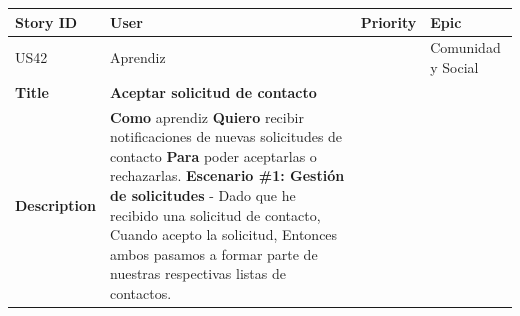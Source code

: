 {\def\LTcaptype{none} %
\begin{longtable}[]{@{}
  >{\raggedright\arraybackslash}p{}
  >{\raggedright\arraybackslash}p{}
  >{\raggedright\arraybackslash}p{}
  >{\raggedright\arraybackslash}p{}@{}}
\toprule\noalign{}
\begin{minipage}[b]{\linewidth}\raggedright
Story ID
\end{minipage} & \begin{minipage}[b]{\linewidth}\raggedright
User
\end{minipage} & \begin{minipage}[b]{\linewidth}\raggedright
Priority
\end{minipage} & \begin{minipage}[b]{\linewidth}\raggedright
Epic
\end{minipage} \\
\midrule\noalign{}
\endhead
\bottomrule\noalign{}
\endlastfoot
US42 & Aprendiz & 3 & Comunidad y Social \\
\textbf{Title} & \textbf{Aceptar solicitud de contacto} & & \\
\textbf{Description} & \textbf{Como} aprendiz \textbf{Quiero} recibir
notificaciones de nuevas solicitudes de contacto \textbf{Para} poder
aceptarlas o rechazarlas. \textbf{Escenario \#1: Gestión de solicitudes}
- Dado que he recibido una solicitud de contacto, Cuando acepto la
solicitud, Entonces ambos pasamos a formar parte de nuestras respectivas
listas de contactos. & & \\
\end{longtable}
}

